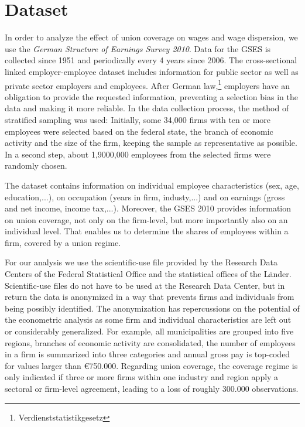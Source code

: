 \section{Dataset}\label{Sec:Data}

In order to analyze the effect of union coverage on wages and wage dispersion, we use the \emph{German Structure of Earnings Survey 2010}. Data for the GSES is collected since 1951 and periodically every 4 years since 2006. The cross-sectional linked employer-employee dataset includes information for public sector as well as private sector employers and employees. After German law,\footnote{ Verdienststatistikgesetz} employers have an obligation to provide the requested information, preventing a selection bias in the data and making it more reliable. In the data collection process, the method of stratified sampling was used: Initially, some 34,000 firms with ten or more employees were selected based on the federal state, the branch of economic activity and the size of the firm, keeping the sample as representative as possible. In a second step, about 1,9000,000 employees from the selected firms were randomly chosen.

The dataset contains information on individual employee characteristics (sex, age, education,...), on occupation (years in firm, industy,...) and on earnings (gross and net income, income tax,...). Moreover, the GSES 2010 provides information on union coverage, not only on the firm-level, but more importantly also on an individual level. That enables us to determine the shares of employees within a firm, covered by a union regime.

For our analysis we use the scientific-use file provided by the Research Data Centers of the Federal Statistical Office and the statistical offices of the L\"ander. Scientific-use files do not have to be used at the Research Data Center, but in return the data is anonymized in a way that prevents firms and individuals from being possibly identified. The anonymization has repercussions on the potential of the econometric analysis as some firm and individual characteristics are left out or considerably generalized. For example, all municipalities are grouped into five regions, branches of economic activity are consolidated, the number of employees in a firm is summarized into three categories and annual gross pay is top-coded for values larger than \euro 750.000. Regarding union coverage, the coverage regime is only indicated if three or more firms within one industry and region apply a sectoral or firm-level agreement, leading to a loss of roughly 300.000 observations. 

